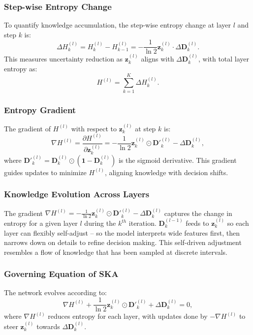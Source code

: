 \documentclass{article}
\begin{document}
\subsubsection*{Step-wise Entropy Change}
To quantify knowledge accumulation, the step-wise entropy change at layer \( l \) and step \( k \) is:
\begin{equation}
	\Delta H^{(l)}_k = H^{(l)}_k - H^{(l)}_{k-1} = -\frac{1}{\ln 2} \mathbf{z}^{(l)}_k \cdot \Delta \mathbf{D}^{(l)}_k.
\end{equation}
This measures uncertainty reduction as \( \mathbf{z}^{(l)}_k \) aligns with \( \Delta \mathbf{D}^{(l)}_k \), with total layer entropy as:
\begin{equation}
	H^{(l)} = \sum_{k=1}^{K} \Delta H^{(l)}_k.
\end{equation}

\subsubsection*{Entropy Gradient}
The gradient of \( H^{(l)} \) with respect to \( \mathbf{z}^{(l)}_k \) at step \( k \) is:
\begin{equation}
	\nabla H^{(l)} = \frac{\partial H^{(l)}}{\partial \mathbf{z}^{(l)}_k} = -\frac{1}{\ln 2} \mathbf{z}^{(l)}_k \odot \mathbf{D}'^{(l)}_k - \Delta \mathbf{D}_k^{(l)},
\end{equation}
where \( \mathbf{D}'^{(l)}_k = \mathbf{D}^{(l)}_k \odot (\mathbf{1} - \mathbf{D}^{(l)}_k) \) is the sigmoid derivative. This gradient guides updates to minimize \( H^{(l)} \), aligning knowledge with decision shifts.

\subsubsection*{Knowledge Evolution Across Layers}
The gradient \( \nabla H^{(l)} = -\frac{1}{\ln 2} \mathbf{z}^{(l)}_k \odot \mathbf{D}'^{(l)}_k - \Delta \mathbf{D}_k^{(l)} \) captures the change in entropy for a given layer \( l \) during the \( k^{th} \) iteration. \( \mathbf{D}^{(l-1)}_k \) feeds to \( \mathbf{z}^{(l)}_k \) so each layer can flexibly self-adjust – so the model interprets wide features first, then narrows down on details to refine decision making. This self-driven adjustment resembles a flow of knowledge that has been sampled at discrete intervals.

\subsubsection*{Governing Equation of SKA}
The network evolves according to:
\begin{equation}
	\nabla H^{(l)} + \frac{1}{\ln 2} \mathbf{z}^{(l)}_k \odot \mathbf{D}'^{(l)}_k + \Delta \mathbf{D}_k^{(l)} = 0,
\end{equation}
where \( \nabla H^{(l)} \) reduces entropy for each layer, with updates done by \( -\nabla H^{(l)} \) to steer \( \mathbf{z}^{(l)}_k \) towards \( \Delta \mathbf{D}^{(l)}_k \).
\end{document}
